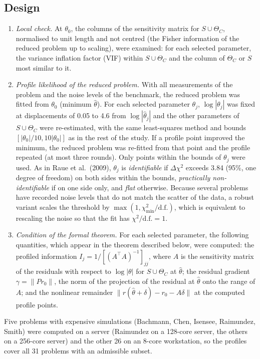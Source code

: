 \subsection*{Design}
\begin{enumerate}\itemsep0pt
\item \emph{Local check.} At $\theta_0$, the columns of the sensitivity matrix for $S\cup\Theta_C$, normalised to unit length and not centred (the Fisher information of the reduced problem up to scaling), were examined: for each selected parameter, the variance inflation factor (VIF) within $S\cup\Theta_C$ and the column of $\Theta_C$ or $S$ most similar to it.
\item \emph{Profile likelihood of the reduced problem.} With all measurements of the problem and the noise levels of the benchmark, the reduced problem was fitted from $\theta_0$ (minimum $\hat\theta$). For each selected parameter $\theta_j$, $\log|\theta_j|$ was fixed at displacements of 0.05 to 4.6 from $\log|\hat\theta_j|$ and the other parameters of $S\cup\Theta_C$ were re-estimated, with the same least-squares method and bounds $[|\theta_0|/10,10|\theta_0|]$ as in the rest of the study. If a profile point improved the minimum, the reduced problem was re-fitted from that point and the profile repeated (at most three rounds). Only points within the bounds of $\theta_j$ were used. As in Raue et al.\ (2009), $\theta_j$ is \emph{identifiable} if $\Delta\chi^2$ exceeds 3.84 (95\%, one degree of freedom) on both sides within the bounds, \emph{practically non-identifiable} if on one side only, and \emph{flat} otherwise. Because several problems have recorded noise levels that do not match the scatter of the data, a robust variant scales the threshold by $\max(1,\chi^2_{\min}/\mathrm{d.f.})$, which is equivalent to rescaling the noise so that the fit has $\chi^2/\mathrm{d.f.}=1$.
\item \emph{Condition of the formal theorem.} For each selected parameter, the following quantities, which appear in the theorem described below, were computed: the profiled information $I_j=1/[(A^{\top}A)^{-1}]_{jj}$, where $A$ is the sensitivity matrix of the residuals with respect to $\log|\theta|$ for $S\cup\Theta_C$ at $\hat\theta$; the residual gradient $\gamma=\|P r_0\|$, the norm of the projection of the residual at $\hat\theta$ onto the range of $A$; and the nonlinear remainder $\|r(\hat\theta+\delta)-r_0-A\delta\|$ at the computed profile points.
\end{enumerate}
Five problems with expensive simulations (Bachmann, Chen, Isensee, Raimundez, Smith) were computed on a server (Raimundez on a 128-core server, the others on a 256-core server) and the other 26 on an 8-core workstation, so the profiles cover all 31 problems with an admissible subset.

